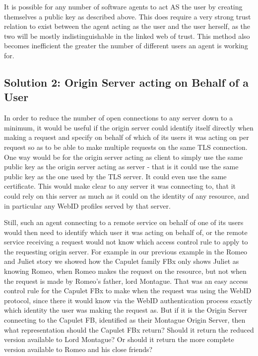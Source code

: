 \documentclass[a4paper]{llncs}
\begin{document}
It is possible for any number of software agents to act AS the user by creating themselves a public key as described above.
This does require a very strong trust relation to exist between the agent acting as the user and the user herself, as the two will be mostly indistinguishable in the linked web of trust. 
This method also becomes inefficient the greater the number of different users  an agent is working for.
 
\subsection{Solution 2: Origin Server acting on Behalf of a User}

In order to reduce the number of open connections to any server down to a minimum, it would be useful if the origin server could identify itself directly when making a request and specify on behalf of which of its users it was acting on per request so as to be able to make multiple requests on the same TLS connection.
One way would be for the origin server acting as client to simply use the same public key as the origin server acting as server - that is it could use the same public key as the one used by the TLS server.
It could even use the same certificate.
This would make clear to any server it was connecting to, that it could rely on this server as much as it could on the identity of any resource, and in particular any WebID profiles served by that server.

Still, such an agent connecting to a remote service on behalf of one of its users would then need to identify which user it was acting on behalf of, or the remote service receiving a request would not know which access control rule to apply to the requesting origin server.
For example in our previous example in the Romeo and Juliet story we showed how the Capulet family FBx only shows Juliet as knowing Romeo, when Romeo makes the request on the resource, but not when the request is made by Romeo's father, lord Montague.
That was an easy access control rule for the Capulet FBx to make when the request was using the WebID protocol, since there it would know via the WebID authentication process exactly which identity the user was making the request as. 
But if it is the Origin Server connecting to the Capulet FB, identified as their Montague Origin Server, then what representation should the Capulet FBx return? 
Should it return the reduced version available to Lord Montague?
Or should it return the more complete version available to Romeo and his close friends?
\end{document}
